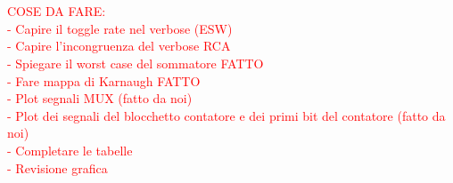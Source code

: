 \documentclass[11pt,  english, makeidx, a4paper, titlepage, oneside]{book}
\begin{document}
\\\\
\textcolor{red}{COSE DA FARE: \\
                - Capire il toggle rate nel verbose (ESW) \\
                - Capire l'incongruenza del verbose RCA \\
                - Spiegare il worst case del sommatore FATTO \\
                - Fare mappa di Karnaugh FATTO \\
                - Plot segnali MUX (fatto da noi) \\
                - Plot dei segnali del blocchetto contatore e dei primi bit del contatore (fatto da noi)\\
                - Completare le tabelle \\
                - Revisione grafica}                
\end{document}
